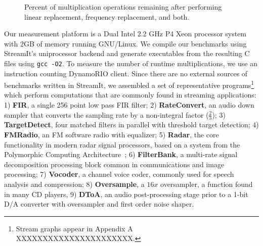\begin{figure}[t]
\center
\epsfxsize=3.2in
\vspace{-6pt}
\caption{Percent of multiplication operations remaining after performing linear replacement, frequency replacement, and both.}
\label{fig:linear-freq-both}
\vspace{-12pt}
\end{figure}


Our measurement platform is a Dual Intel 2.2 GHz P4 Xeon processor
system with 2GB of memory running GNU/Linux. We compile our benchmarks
using StreamIt's uniprocessor backend and generate executables from
the resulting C files using {\tt gcc -O2}.  To measure the number of
runtime multiplications, we use an instruction counting
DynamoRIO\cite{dynamo99} client.  Since there are no external sources
of benchmarks written in StreamIt, we assembled a set of
representative programs\footnote{Stream graphs appear in Appendix A
XXXXXXXXXXXXXXXXXXXXXX.} which perform computations that are commonly
found in streaming applications: 1) {\bf FIR}, a single 256 point low
pass FIR filter; 2) {\bf RateConvert}, an audio down sampler that
converts the sampling rate by a non-integral factor ($\frac{2}{3}$);
3) {\bf TargetDetect}, four matched filters in parallel with threshold
target detection; 4) {\bf FMRadio}, an FM software radio with
equalizer; 5) {\bf Radar}, the core functionality in modern radar
signal processors, based on a system from the Polymorphic Computing
Architecture~\cite{pca}; 6) {\bf FilterBank}, a multi-rate signal
decomposition processing block common in communications and image
processing; 7) {\bf Vocoder}, a channel voice coder, commonly used for
speech analysis and compression; 8) {\bf Oversample}, a $16x$
oversampler, a function found in many CD players, 9) {\bf DToA}, an
audio post-processing stage prior to a 1-bit D/A converter with
oversampler and first order noise shaper.

